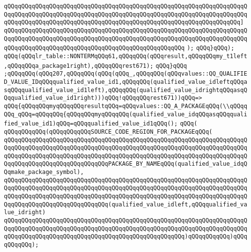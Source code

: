\verb|qQQqqQQqqQQqqQQqqQQqqQQqqQQqqQQqqQQqqQQqqQQqqQQqqQQqqQQqqQQqqQQqqQQqqQQqqQQqqQQqqQQqqQQqqQQqqQQqqQQqqQQqqQQqqQQqqQQqqQQqqQQqqQQqqQQqqQQqqQQqqQQqqQQqqQQqqQQqqQQqqQQqqQQqqQQqqQQqqQQqqQQqqQQqqQQqqQQqqQQqqQQqqQQq]|\newline
\verb|qQQqqQQqqQQqqQQqqQQqqQQqqQQqqQQqqQQqqQQqqQQqqQQqqQQqqQQqqQQqqQQqqQQqqQQqqQQqqQQqqQQqqQQqqQQqqQQqqQQqqQQqqQQqqQQqqQQqqQQqqQQqqQQqqQQqqQQqqQQqqQQqqQQqqQQqqQQqqQQqqQQqqQQqqQQqqQQqqQQqqQQqqQQqqQQq|\newline
\verb|);|\newline
\verb|qQQq}qQQq);|\newline
\verb|qQQq(qQQqlr_table::NONTERMqQQq61,qQQqqQQq(qQQqresult,qQQqqQQqmy_t1left,qQQqqQQqa_package1right),qQQqqQQqrest671);|\newline
\verb|qQQq}qQQq|\newline
\verb|;qQQqqQQq(qQQq207,qQQqqQQq(qQQq(qQQq_,qQQqqQQq(qQQqvalues::QQ_QUALIFIED_VALUE_IDqQQqqualified_value_id1,qQQqqQQq(qualified_value_idleftqQQqasqQQqqualified_value_id1left),qQQqqQQq(qualified_value_idrightqQQqasqQQqqualified_value_id1right)))qQQq!qQQqqQQqrest671))qQQq=>|\newline
\verb|qQQq{qQQqqQQqmyqQQqqQQqresultqQQq=qQQqvalues::QQ_A_PACKAGEqQQq(\\qQQqqQQq_qQQq=qQQqqQQq{qQQqqQQqmyqQQqqQQq(qualified_value_idqQQqasqQQqqualified_value_id1)qQQq=qQQqqualified_value_id1qQQq();|\newline
\verb|qQQq(|\newline
\verb|qQQqqQQqqQQq(qQQqqQQqqQQqSOURCE_CODE_REGION_FOR_PACKAGEqQQq(|\newline
\verb|qQQqqQQqqQQqqQQqqQQqqQQqqQQqqQQqqQQqqQQqqQQqqQQqqQQqqQQqqQQqqQQqqQQqqQQqqQQqqQQqqQQqqQQqqQQqqQQqqQQqqQQqqQQqqQQqqQQqqQQqqQQqqQQqqQQqqQQqqQQqqQQqqQQqqQQqqQQqqQQqqQQqqQQqqQQqqQQqqQQqqQQqqQQqqQQqqQQqqQQqqQQqqQQqqQQqqQQqqQQqqQQqqQQqqQQqqQQqqQQqPACKAGE_BY_NAMEqQQq(qualified_value_idqQQqmake_package_symbol),|\newline
\verb|qQQqqQQqqQQqqQQqqQQqqQQqqQQqqQQqqQQqqQQqqQQqqQQqqQQqqQQqqQQqqQQqqQQqqQQqqQQqqQQqqQQqqQQqqQQqqQQqqQQqqQQqqQQqqQQqqQQqqQQqqQQqqQQqqQQqqQQqqQQqqQQqqQQqqQQqqQQqqQQqqQQqqQQqqQQqqQQqqQQqqQQqqQQqqQQqqQQqqQQqqQQqqQQqqQQqqQQqqQQqqQQqqQQqqQQqqQQqqQQq(qualified_value_idleft,qQQqqualified_value_idright)|\newline
\verb|qQQqqQQqqQQqqQQqqQQqqQQqqQQqqQQqqQQqqQQqqQQqqQQqqQQqqQQqqQQqqQQqqQQqqQQqqQQqqQQqqQQqqQQqqQQqqQQqqQQqqQQqqQQqqQQqqQQqqQQqqQQqqQQqqQQqqQQqqQQqqQQqqQQqqQQqqQQqqQQqqQQqqQQqqQQqqQQqqQQqqQQqqQQqqQQq)qQQqqQQqqQQq)qQQqqQQqqQQq);|\newline
